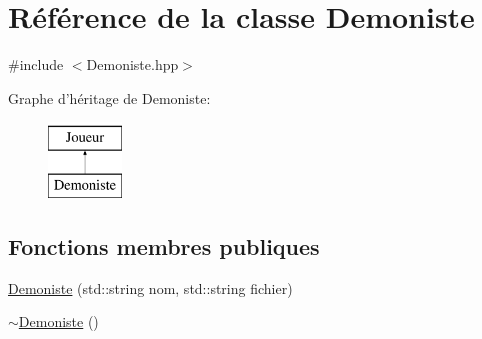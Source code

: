 \hypertarget{class_demoniste}{\section{\-Référence de la classe \-Demoniste}
\label{class_demoniste}
}


{\ttfamily \#include $<$\-Demoniste.\-hpp$>$}

\-Graphe d'héritage de \-Demoniste\-:\begin{figure}[H]
\begin{center}
\leavevmode
\includegraphics[height=2.000000cm]{class_demoniste}
\end{center}
\end{figure}
\subsection*{\-Fonctions membres publiques}
\begin{DoxyCompactItemize}
\item 
\hyperlink{class_demoniste_af380ca447e054e2096618ac7e2607c5a}{\-Demoniste} (std\-::string nom, std\-::string fichier)
\item 
\hyperlink{class_demoniste_ae66a10386b9ec772fe4b3d9e94deffe8}{$\sim$\-Demoniste} ()
\end{DoxyCompactItemize}


